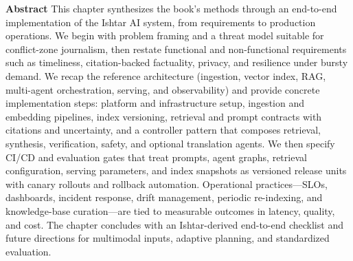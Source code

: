 \textbf{Abstract} This chapter synthesizes the book's methods through an end-to-end implementation of the Ishtar AI system, from requirements to production operations. We begin with problem framing and a threat model suitable for conflict-zone journalism, then restate functional and non-functional requirements such as timeliness, citation-backed factuality, privacy, and resilience under bursty demand. We recap the reference architecture (ingestion, vector index, RAG, multi-agent orchestration, serving, and observability) and provide concrete implementation steps: platform and infrastructure setup, ingestion and embedding pipelines, index versioning, retrieval and prompt contracts with citations and uncertainty, and a controller pattern that composes retrieval, synthesis, verification, safety, and optional translation agents. We then specify CI/CD and evaluation gates that treat prompts, agent graphs, retrieval configuration, serving parameters, and index snapshots as versioned release units with canary rollouts and rollback automation. Operational practices—SLOs, dashboards, incident response, drift management, periodic re-indexing, and knowledge-base curation—are tied to measurable outcomes in latency, quality, and cost. The chapter concludes with an Ishtar-derived end-to-end checklist and future directions for multimodal inputs, adaptive planning, and standardized evaluation.

